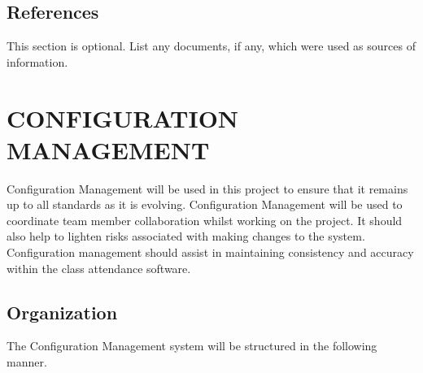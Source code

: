 \documentclass[letterpaper,12pt,oneside,listof=totoc]{scrreprt}
\begin{document}
\section{References}

This section is optional. List any documents, if any, which were used as sources of information.


\chapter{CONFIGURATION MANAGEMENT}

Configuration Management will be used in this project to ensure that it remains up to all standards as it is evolving. Configuration Management will be used to coordinate team member collaboration whilst working on the project. It should also help to lighten risks associated with making changes to the system. Configuration management should assist in maintaining consistency and accuracy within the class attendance software. 

\section{Organization}

The Configuration Management system will be structured in the following manner.
\end{document}
